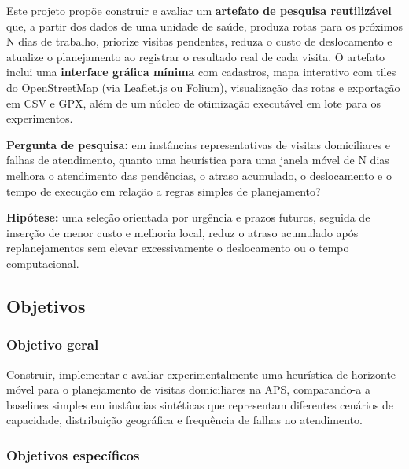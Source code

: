 \documentclass[11pt,a4paper]{article}
\begin{document}
Este projeto propõe construir e avaliar um \textbf{artefato de pesquisa
reutilizável} que, a partir dos dados de uma unidade de saúde, produza
rotas para os próximos N dias de trabalho, priorize visitas pendentes,
reduza o custo de deslocamento e atualize o planejamento ao registrar o
resultado real de cada visita. O artefato inclui uma \textbf{interface
gráfica mínima} com cadastros, mapa interativo com tiles do
OpenStreetMap (via Leaflet.js ou Folium), visualização das rotas e
exportação em CSV e GPX, além de um núcleo de otimização executável em
lote para os experimentos.

\textbf{Pergunta de pesquisa:} em instâncias representativas de visitas
domiciliares e falhas de atendimento, quanto uma heurística para uma
janela móvel de N dias melhora o atendimento das pendências, o atraso
acumulado, o deslocamento e o tempo de execução em relação a regras
simples de planejamento?

\textbf{Hipótese:} uma seleção orientada por urgência e prazos futuros,
seguida de inserção de menor custo e melhoria local, reduz o atraso
acumulado após replanejamentos sem elevar excessivamente o deslocamento
ou o tempo computacional.

\subsection{Objetivos}\label{objetivos}

\subsubsection{Objetivo geral}\label{objetivo-geral}

Construir, implementar e avaliar experimentalmente uma heurística de
horizonte móvel para o planejamento de visitas domiciliares na APS,
comparando-a a baselines simples em instâncias sintéticas que
representam diferentes cenários de capacidade, distribuição geográfica e
frequência de falhas no atendimento.

\subsubsection{Objetivos específicos}\label{objetivos-especuxedficos}
\end{document}
